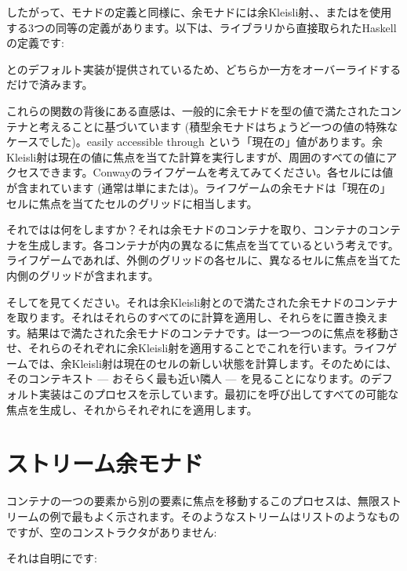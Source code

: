 したがって、モナドの定義と同様に、余モナドには余Kleisli射、、またはを使用する3つの同等の定義があります。以下は、ライブラリから直接取られたHaskellの定義です: 

とのデフォルト実装が提供されているため、どちらか一方をオーバーライドするだけで済みます。

これらの関数の背後にある直感は、一般的に余モナドを型の値で満たされたコンテナと考えることに基づいています (積型余モナドはちょうど一つの値の特殊なケースでした)。easily accessible through という「現在の」値があります。余Kleisli射は現在の値に焦点を当てた計算を実行しますが、周囲のすべての値にアクセスできます。Conwayのライフゲームを考えてみてください。各セルには値が含まれています (通常は単にまたは)。ライフゲームの余モナドは「現在の」セルに焦点を当てたセルのグリッドに相当します。

それではは何をしますか？それは余モナドのコンテナを取り、コンテナのコンテナを生成します。各コンテナが内の異なるに焦点を当てているという考えです。ライフゲームであれば、外側のグリッドの各セルに、異なるセルに焦点を当てた内側のグリッドが含まれます。

そしてを見てください。それは余Kleisli射とので満たされた余モナドのコンテナを取ります。それはそれらのすべてのに計算を適用し、それらをに置き換えます。結果はで満たされた余モナドのコンテナです。は一つ一つのに焦点を移動させ、それらのそれぞれに余Kleisli射を適用することでこれを行います。ライフゲームでは、余Kleisli射は現在のセルの新しい状態を計算します。そのためには、そのコンテキスト --- おそらく最も近い隣人 --- を見ることになります。のデフォルト実装はこのプロセスを示しています。最初にを呼び出してすべての可能な焦点を生成し、それからそれぞれにを適用します。

\section{ストリーム余モナド}

コンテナの一つの要素から別の要素に焦点を移動するこのプロセスは、無限ストリームの例で最もよく示されます。そのようなストリームはリストのようなものですが、空のコンストラクタがありません: 

それは自明にです: 

